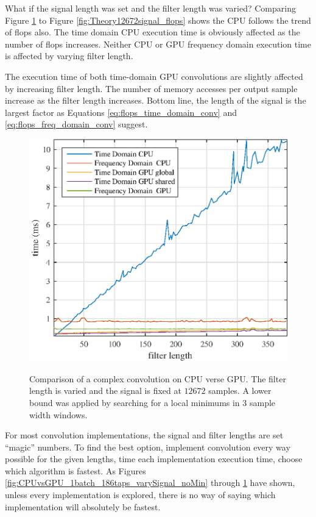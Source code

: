 What if the signal length was set and the filter length was varied?
Comparing Figure \ref{fig:CPUvsGPU_1batch_12672signal_varyFilter} to Figure \ref{fig:Theory12672signal_flops} shows the CPU follows the trend of flops also.
The time domain CPU execution time is obviously affected as the number of flops increases.
Neither CPU or GPU frequency domain execution time is affected by varying filter length.

The execution time of both time-domain GPU convolutions are slightly affected by increasing filter length.
The number of memory accesses per output sample increase as the filter length increases.
Bottom line, the length of the signal is the largest factor as Equations \ref{eq:flops_time_domain_conv} and \ref{eq:flops_freq_domain_conv} suggest.
\begin{figure}
	\centering\includegraphics[width=5in]{figures/gpu_intro/CPUvsGPU_1batch_12672signal_varyFilter.eps}
	\label{fig:CPUvsGPU_1batch_12672signal_varyFilter}
	\caption{Comparison of a complex convolution on CPU verse GPU. The filter length is varied and the signal is fixed at $12672$ samples. A lower bound was applied by searching for a local minimums in $3$ sample width windows.}
\end{figure}

For most convolution implementations, the signal and filter lengths are set ``magic'' numbers.
To find the best option, implement convolution every way possible for the given lengths, time each implementation execution time, choose which algorithm is fastest.
As Figures \ref{fig:CPUvsGPU_1batch_186taps_varySignal_noMin} through \ref{fig:CPUvsGPU_1batch_12672signal_varyFilter} have shown, unless every implementation is explored, there is no way of saying which implementation will absolutely be fastest.

